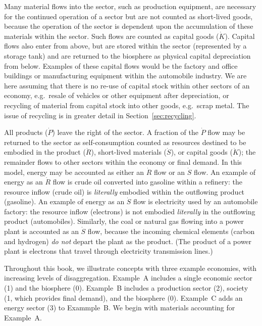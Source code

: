 Many material flows into the sector, such as production equipment,
are necessary for the continued operation of a sector 
but are not counted as short-lived goods, 
because the operation of the sector is dependent 
upon the accumulation of these materials within the sector. 
Such flows are counted as capital goods 
($\dot{K}$).
Capital flows also enter from above, 
but are stored within the sector (represented by a storage tank) 
and are returned to the biosphere as 
physical capital depreciation from below.
Examples of these capital flows would be the factory and office buildings or
manufacturing equipment within the automobile industry.
We are here assuming that there is no re-use of capital stock
within other sectors of an economy,
e.g.\ resale of vehicles or other equipment after depreciation,
or recycling of material from capital stock into other goods,
e.g.\ scrap metal. 
The issue of recycling is in greater detail in
Section~\ref{sec:recycling}.

All products ($\dot{P}$) leave the right of the sector. 
A fraction of the $\dot{P}$ flow may be returned to the sector as self-consumption 
counted as resources destined to be embodied in the product ($\dot{R}$), 
short-lived materials ($\dot{S}$), or 
capital goods ($\dot{K}$); 
the remainder flows to other sectors within the economy or final demand. 
In this model, energy may be accounted
as either an $\dot{R}$ flow or an $\dot{S}$ flow.
An example of energy as an $\dot{R}$ flow is crude oil converted into
gasoline within a refinery: the resource inflow (crude oil) is
\emph{literally} embodied within the outflowing product (gasoline).
An example of energy as an $\dot{S}$ flow is electricity
used by an automobile factory: the resource inflow (electrons)
is not embodied \emph{literally} in the outflowing product (automobiles).
Similarly, the coal or natural gas flowing into a
power plant is accounted as an $\dot{S}$ flow, 
because the incoming chemical elements (carbon and hydrogen) \emph{do
not} depart the plant as the product.  
(The product of a power plant is electrons that travel through
electricity transmission lines.)

Throughout this book, we illustrate concepts with three example economies, 
with increasing levels of disaggregation. 
Example~A includes a single economic sector (1) and the biosphere (0).
Example~B includes a production sector (2), society (1, which provides final demand),
and the biosphere (0). 
Example~C adds an energy sector (3) to Exammple~B.
We begin with materials accounting for Example~A.



